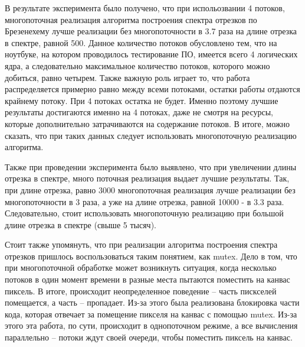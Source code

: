 В результате эксперимента было получено, что при испольозвании 4 потоков, многопоточная реализация алгоритма построения спектра отрезков по Брезенехему лучше реализации без многопоточности в 3.7 раза на длине отрезка в спектре, равной 500. Данное количество потоков обусловлено тем, что на ноутбуке, на котором проводилось тестирование ПО, имеется всего 4 логических ядра, а следовательно максимальное количество потоков, которого можно добиться, равно четырем. Также важную роль играет то, что работа распределяется примерно равно между всеми потоками, остатки работы отдаются крайнему потоку. При 4 потоках остатка не будет. Именно поэтому лучшие результаты достигаются именно на 4 потоках, даже не смотря на ресурсы, которые дополнительно затрачиваются на содержание потоков. В итоге, можно сказать, что при таких данных следует использовать многопоточную реализацию алгоритма.

Также при проведении эксперимента было выявлено, что при увеличении длины отрезка в спектре, много поточная реализация выдает лучшие результаты. Так, при длине отрезка, равно 3000 многопоточная реализация лучше реализации без многопоточности в 3 раза, а уже на длине отрезка, равной 10000 - в 3.3 раза. Следовательно, стоит использовать многопоточную реализацию при большой длине отрезка в спектре (свыше 5 тысяч).

Стоит также упомянуть, что при реализации алгоритма построения спектра отрезков пришлось воспользоваться таким понятием, как mutex. Дело в том, что при многопоточной обработке может возникнуть ситуация, когда несколько потоков в один момент времени в разные места пытаются поместить на канвас пиксель. В итоге, происходит неопределенное поведение -- часть пискселей помещается, а часть -- пропадает. Из-за этого была реализована блокировка части кода, которая отвечает за помещение пикселя на канвас с помощью mutex. Из-за этого эта работа, по сути, происходит в однопоточном режиме, а все вычисления параллельно -- потоки ждут своей очереди, чтобы поместить пиксель на канвас.
